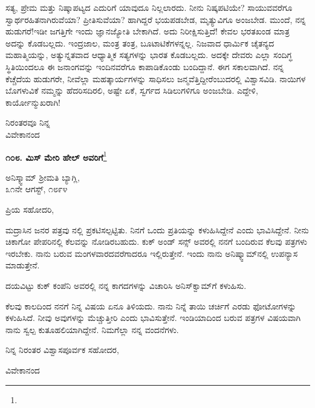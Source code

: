 \vspace{0.2cm}

ಸತ್ಯ, ಪ್ರೇಮ ಮತ್ತು ನಿಷ್ಕಾಪಟ್ಯದ ಎದುರಿಗೆ ಯಾವುದೂ ನಿಲ್ಲಲಾರದು. ನೀನು ನಿಷ್ಕಪಟಿಯೇ? ಸಾಯುವವರೆಗೂ ಸ್ವಾರ್ಥರಹಿತನಾಗಿರುವೆಯಾ? ಪ್ರೀತಿಸುವೆಯಾ? ಹಾಗಿದ್ದರೆ ಭಯಪಡಬೇಡ, ಮೃತ್ಯುವಿಗೂ ಅಂಜಬೇಡ. ಮುಂದೆ, ನನ್ನ ಹುಡುಗರೆ!ಇಡೀ ಜಗತ್ತಿಗೇ ಇಂದು ಜ್ಞಾನಜ್ಯೋತಿ ಬೇಕಾಗಿದೆ. ಅದು ನಿರೀಕ್ಷಿಸುತ್ತಿದೆ! ಕೇವಲ ಭರತಖಂಡ ಮಾತ್ರ ಅದನ್ನು ಕೊಡಬಲ್ಲದು. ಇಂದ್ರಜಾಲ, ಮಂತ್ರ ತಂತ್ರ, ಬೂಟಾಟಿಕೆಗಳನ್ನಲ್ಲ. ನಿಜವಾದ ಧಾರ್ಮಿಕ ಚೈತನ್ಯದ ಮಹಾತ್ಮಿಯನ್ನು, ಅತ್ಯುನ್ನತವಾದ ಆಧ್ಯಾತ್ಮಿಕ ಸತ್ಯಗಳನ್ನು ಭಾರತ ಕೊಡಬಲ್ಲದು. ಅದಕ್ಕೇ ದೇವರು ಎಲ್ಲಾ ಸಂದಿಗ್ಧ ಸ್ಥಿತಿಯಿಂದಲೂ ಈ ಜನಾಂಗವನ್ನು ಇಂದಿನವರೆಗೂ ಕಾಪಾಡಿಕೊಂಡು ಬಂದಿದ್ದಾನೆ. ಈಗ ಸಕಾಲವಾಗಿದೆ. ನನ್ನ ಕೆಚ್ಚೆದೆಯ ಹುಡುಗರೇ, ನೀವೆಲ್ಲಾ ಮಹತ್ಕಾರ್ಯಗಳನ್ನು ಸಾಧಿಸಲು ಜನ್ಮವೆತ್ತಿದ್ದೀರೆಂಬುದರಲ್ಲಿ ವಿಶ್ವಾಸವಿಡಿ. ನಾಯಿಗಳ ಬೊಗಳುವಿಕೆ ನಮ್ಮನ್ನು ಹೆದರಿಸದಿರಲಿ, ಅಷ್ಟೇ ಏಕೆ, ಸ್ವರ್ಗದ ಸಿಡಿಲುಗಳಿಗೂ ಅಂಜಬೇಡಿ. ಎದ್ದೇಳಿ, ಕಾರ್ಯೋನ್ಮುಖರಾಗಿ!

{\flushright
ನಿರಂತರವೂ ನಿನ್ನ\\ವಿವೇಕಾನಂದ\par}

\begin{center}
\textbf{೧೦೮. ಮಿಸ್ ಮೇರಿ ಹೇಲ್‌ ಅವರಿಗೆ}\footnote{}
\end{center}

\begin{flushright}
ಅನಿಸ್ಕ್ವಾಮ್  ಶ‍್ರೀಮತಿ ಬ್ಯಾಗ್ಲಿ,\\೩೧ನೇ ಆಗಸ್ಟ್, ೧೮೯೪
\end{flushright}

\noindent
ಪ್ರಿಯ ಸಹೋದರಿ,

\vspace{0.1cm}

ಮದ್ರಾಸಿನ ಜನರ ಪತ್ರವು  ನಲ್ಲಿ ಪ್ರಕಟಿಸಲ್ಪಟ್ಟಿತು. ನಿನಗೆ ಒಂದು ಪ್ರತಿಯನ್ನು ಕಳುಹಿಸಿದ್ದೇನೆ ಎಂದು ಭಾವಿಸಿದ್ದೇನೆ. ನೀನು ಚಿಕಾಗೋ ಪೇಪರಿನಲ್ಲಿ ಕೆಲವನ್ನು ನೋಡಿರಬಹುದು. ಕುಕ್ ಅಂಡ್ ಸನ್ಸ್ ಅವರಲ್ಲಿ ನನಗೆ ಬಂದಿರುವ ಕೆಲವು ಪತ್ರಗಳು ಇರಬೇಕು. ನಾನು ಬರುವ ಮಂಗಳವಾರದವರೆಗಾದರೂ ಇಲ್ಲಿರುತ್ತೇನೆ. ಇಂದು ನಾನು ಅನಿಷ್ಕ್ವಾಮ್‌ನಲ್ಲಿ ಉಪನ್ಯಾಸ ಮಾಡುತ್ತೇನೆ.

ದಯವಿಟ್ಟು ಕುಕ್ ಕಂಪೆನಿ ಅವರಲ್ಲಿ ನನ್ನ ಕಾಗದಗಳನ್ನು ವಿಚಾರಿಸಿ ಅನಿಸ್‌ಕ್ವಾಮ್‌ಗೆ ಕಳುಹಿಸು.

ಕೆಲವು ಕಾಲದಿಂದ ನನಗೆ ನಿನ್ನ ವಿಷಯ ಏನೂ ತಿಳಿಯದು. ನಾನು ನಿನ್ನೆ ತಾಯಿ ಚರ್ಚಿಗೆ ಎರಡು ಫೋಟೋಗಳನ್ನು ಕಳುಹಿಸಿದೆ. ನೀವು ಅವುಗಳನ್ನು ಮೆಚ್ಚುತ್ತೀರಿ ಎಂದು ಭಾವಿಸುತ್ತೇನೆ. ಇಂಡಿಯಾದಿಂದ ಬರುವ ಪತ್ರಗಳ ವಿಷಯವಾಗಿ ನಾನು ಸ್ವಲ್ಪ ಕುತೂಹಲಿಯಾಗಿದ್ದೇನೆ. ನಿಮಗೆಲ್ಲಾ ನನ್ನ ವಂದನೆಗಳು.

ನಿನ್ನ ನಿರಂತರ ವಿಶ್ವಾಸಪೂರ್ವಕ ಸಹೋದರ,

\begin{flushright}
ವಿವೇಕಾನಂದ
\end{flushright}

